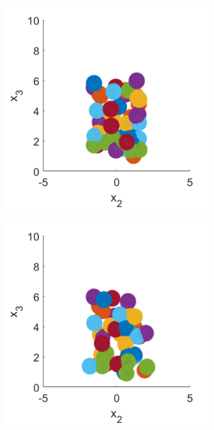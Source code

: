 \begin{figure}
\centering
\begin{subfigure}[b]{0.2\textwidth}
    \centering
    \includegraphics[width=\textwidth]{Images/squirmers/Gyro-1-All.pdf}
    \caption[]{\label{fig:squirmerPosA}} 
\end{subfigure} \hfill
\begin{subfigure}[b]{0.2\textwidth}
    \centering
    \includegraphics[width=\textwidth]{Images/squirmers/Gyro-2-All.pdf}

\end{subfigure}
\end{figure}

